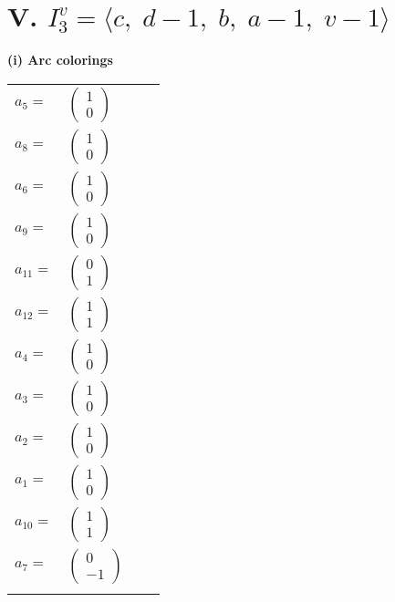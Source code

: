 \documentclass[1p]{elsarticle_modified}
\theoremstyle{definition}
\begin{document}
\centering \section*{V. $I^v_{3}= \langle c,\;d-1,\;b,\;a-1,\;v-1 \rangle$}
\flushleft \textbf{(i) Arc colorings}\\
\begin{tabular}{m{7pt} m{180pt} m{7pt} m{180pt} }
\flushright $a_{5}=$&$\begin{pmatrix}1\\0\end{pmatrix}$ \\
\flushright $a_{8}=$&$\begin{pmatrix}1\\0\end{pmatrix}$ \\
\flushright $a_{6}=$&$\begin{pmatrix}1\\0\end{pmatrix}$ \\
\flushright $a_{9}=$&$\begin{pmatrix}1\\0\end{pmatrix}$ \\
\flushright $a_{11}=$&$\begin{pmatrix}0\\1\end{pmatrix}$ \\
\flushright $a_{12}=$&$\begin{pmatrix}1\\1\end{pmatrix}$ \\
\flushright $a_{4}=$&$\begin{pmatrix}1\\0\end{pmatrix}$ \\
\flushright $a_{3}=$&$\begin{pmatrix}1\\0\end{pmatrix}$ \\
\flushright $a_{2}=$&$\begin{pmatrix}1\\0\end{pmatrix}$ \\
\flushright $a_{1}=$&$\begin{pmatrix}1\\0\end{pmatrix}$ \\
\flushright $a_{10}=$&$\begin{pmatrix}1\\1\end{pmatrix}$ \\
\flushright $a_{7}=$&$\begin{pmatrix}0\\-1\end{pmatrix}$\\&\end{tabular}
\end{document}
